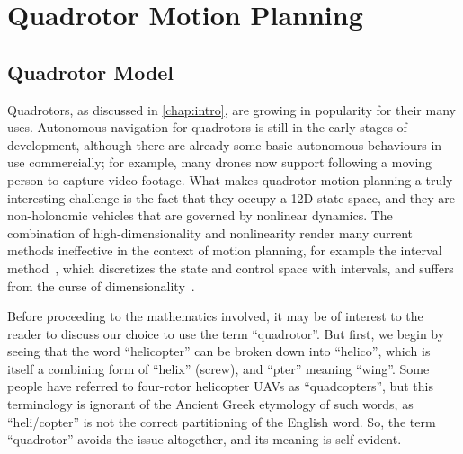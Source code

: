 \chapter{Quadrotor Motion Planning}\label{chap:quad}



\section{Quadrotor Model}

Quadrotors, as discussed in \autoref{chap:intro}, are growing in popularity for their many uses. Autonomous navigation for quadrotors is still in the early stages of development, although there are already some basic autonomous behaviours in use commercially; for example, many drones now support following a moving person to capture video footage. What makes quadrotor motion planning a truly interesting challenge is the fact that they occupy a 12D state space, and they are non-holonomic vehicles that are governed by nonlinear dynamics. The combination of high-dimensionality and nonlinearity render many current methods ineffective in the context of motion planning, for example the interval method~\cite{jaulin2001,Li2018}, which discretizes the state and control space with intervals, and suffers from the curse of dimensionality~\cite{Indyk1998}.

Before proceeding to the mathematics involved, it may be of interest to the reader to discuss our choice to use the term ``quadrotor''. But first, we begin by seeing that the word ``helicopter'' can be broken down into ``helico'', which is itself a combining form of ``helix'' (screw), and ``pter'' meaning ``wing''. Some people have referred to four-rotor helicopter UAVs as ``quadcopters'', but this terminology is ignorant of the Ancient Greek etymology of such words, as ``heli/copter'' is not the correct partitioning of the English word. So, the term ``quadrotor'' avoids the issue altogether, and its meaning is self-evident.

